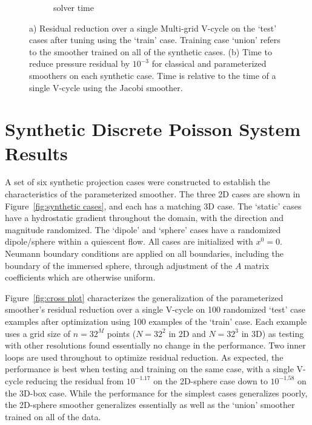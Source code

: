 \documentclass[review]{elsarticle}
\begin{document}
\begin{figure}
\begin{subfigure}[b]{0.47\textwidth}
        \caption{solver time}
        \label{fig:synthetic time}
    \end{subfigure}
    \caption{a) Residual reduction over a single Multi-grid V-cycle on the `test' cases after tuning using the `train' case. Training case `union' refers to the smoother trained on all of the synthetic cases. (b) Time to reduce pressure residual by $10^{-3}$ for classical and parameterized smoothers on each synthetic case. Time is relative to the time of a single V-cycle using the Jacobi smoother.}
    \label{fig:synthetic results}
\end{figure}

\section{Synthetic Discrete Poisson System Results}

A set of six synthetic projection cases were constructed to establish the characteristics of the parameterized smoother. The three 2D cases are shown in Figure~\ref{fig:synthetic cases}, and each has a matching 3D case. The `static' cases have a hydrostatic gradient throughout the domain, with the direction and magnitude randomized. The `dipole' and `sphere' cases have a randomized dipole/sphere within a quiescent flow. All cases are initialized with $x^0=0$.
Neumann boundary conditions are applied on all boundaries, including the boundary of the immersed sphere, through adjustment of the $A$ matrix coefficients which are otherwise uniform. 

Figure~\ref{fig:cross plot} characterizes the generalization of the parameterized smoother's residual reduction over a single V-cycle on 100 randomized `test' case examples after optimization using 100 examples of the `train' case. Each example uses a grid size of $n=32^M$ points ($N=32^2$ in 2D and $N=32^3$ in 3D) as testing with other resolutions found essentially no change in the performance. Two inner loops are used throughout to optimize residual reduction. As expected, the performance is best when testing and training on the same case, with a single V-cycle reducing the residual from $10^{-1.17}$ on the 2D-sphere case down to $10^{-1.58}$ on the 3D-box case. While the performance for the simplest cases generalizes poorly, the 2D-sphere smoother generalizes essentially as well as the `union' smoother trained on all of the data. 
\end{document}
